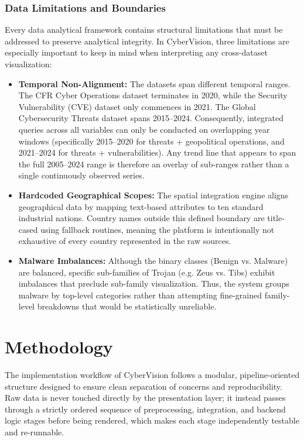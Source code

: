 \documentclass[a4paper, 12pt]{report}
\begin{document}
\subsection{Data Limitations and Boundaries}
Every data analytical framework contains structural limitations that must be addressed to preserve analytical integrity. In CyberVision, three limitations are especially important to keep in mind when interpreting any cross-dataset visualization:
\begin{itemize}
    \item \textbf{Temporal Non-Alignment:} The datasets span different temporal ranges. The CFR Cyber Operations dataset terminates in 2020, while the Security Vulnerability (CVE) dataset only commences in 2021. The Global Cybersecurity Threats dataset spans 2015--2024. Consequently, integrated queries across all variables can only be conducted on overlapping year windows (specifically 2015--2020 for threats + geopolitical operations, and 2021--2024 for threats + vulnerabilities). Any trend line that appears to span the full 2005--2024 range is therefore an overlay of sub-ranges rather than a single continuously observed series.
    \item \textbf{Hardcoded Geographical Scopes:} The spatial integration engine aligns geographical data by mapping text-based attributes to ten standard industrial nations. Country names outside this defined boundary are title-cased using fallback routines, meaning the platform is intentionally not exhaustive of every country represented in the raw sources.
    \item \textbf{Malware Imbalances:} Although the binary classes (Benign vs. Malware) are balanced, specific sub-families of Trojan (e.g. Zeus vs. Tibs) exhibit imbalances that preclude sub-family visualization. Thus, the system groups malware by top-level categories rather than attempting fine-grained family-level breakdowns that would be statistically unreliable.
\end{itemize}

\chapter{Methodology}
The implementation workflow of CyberVision follows a modular, pipeline-oriented structure designed to ensure clean separation of concerns and reproducibility. Raw data is never touched directly by the presentation layer; it instead passes through a strictly ordered sequence of preprocessing, integration, and backend logic stages before being rendered, which makes each stage independently testable and re-runnable.
\end{document}
